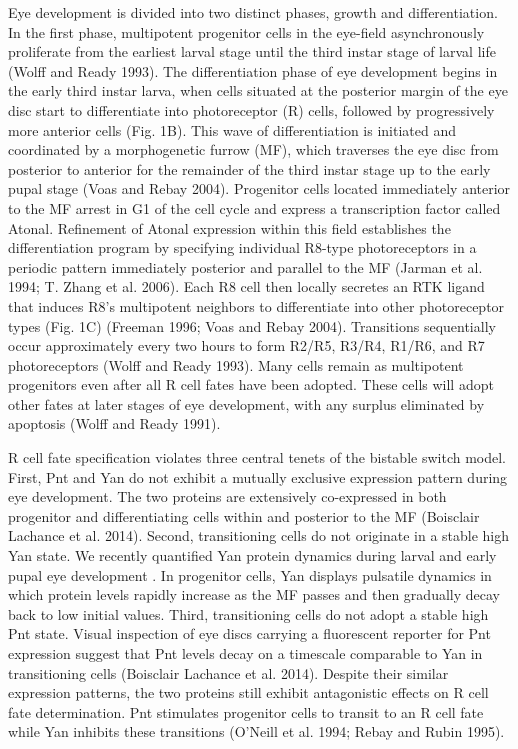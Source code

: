 Eye development is divided into two distinct phases, growth and differentiation. In the first phase, multipotent progenitor cells in the eye-field asynchronously proliferate from the earliest larval stage until the third instar stage of larval life (Wolff and Ready 1993). The differentiation phase of eye development begins in the early third instar larva, when cells situated at the posterior margin of the eye disc start to differentiate into photoreceptor (R) cells, followed by progressively more anterior cells (Fig. 1B). This wave of differentiation is initiated and coordinated by a morphogenetic furrow (MF), which traverses the eye disc from posterior to anterior for the remainder of the third instar stage up to the early pupal stage (Voas and Rebay 2004). Progenitor cells located immediately anterior to the MF arrest in G1 of the cell cycle and express a transcription factor called Atonal. Refinement of Atonal expression within this field establishes the differentiation program by specifying individual R8-type photoreceptors in a periodic pattern immediately posterior and parallel to the MF (Jarman et al. 1994; T. Zhang et al. 2006). Each R8 cell then locally secretes an RTK ligand that induces R8's multipotent neighbors to differentiate into other photoreceptor types (Fig. 1C) (Freeman 1996; Voas and Rebay 2004). Transitions sequentially occur approximately every two hours to form R2/R5, R3/R4, R1/R6, and R7 photoreceptors (Wolff and Ready 1993). Many cells remain as multipotent progenitors even after all R cell fates have been adopted. These cells will adopt other fates at later stages of eye development, with any surplus eliminated by apoptosis (Wolff and Ready 1991).

R cell fate specification violates three central tenets of the bistable switch model. First, Pnt and Yan do not exhibit a mutually exclusive expression pattern during eye development. The two proteins are extensively co-expressed in both progenitor and differentiating cells within and posterior to the MF (Boisclair Lachance et al. 2014). Second, transitioning cells do not originate in a stable high Yan state. We recently quantified Yan protein dynamics during larval and early pupal eye development \cite{Pelaez2015}. In progenitor cells, Yan displays pulsatile dynamics in which protein levels rapidly increase as the MF passes and then gradually decay back to low initial values. Third, transitioning cells do not adopt a stable high Pnt state. Visual inspection of eye discs carrying a fluorescent reporter for Pnt expression suggest that Pnt levels decay on a timescale comparable to Yan in transitioning cells (Boisclair Lachance et al. 2014). Despite their similar expression patterns, the two proteins still exhibit antagonistic effects on R cell fate determination. Pnt stimulates progenitor cells to transit to an R cell fate while Yan inhibits these transitions (O'Neill et al. 1994; Rebay and Rubin 1995).

